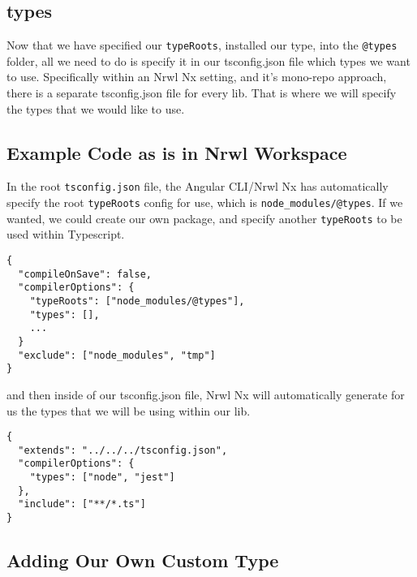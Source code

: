 \subsection{types}
Now that we have specified our \lstinline{typeRoots}, installed our type, into 
the \lstinline{@types} folder, all we need to do is specify it in our 
tsconfig.json file which types we want to use. Specifically within an Nrwl Nx 
setting, and it's mono-repo approach, there is a separate tsconfig.json file 
for every lib. That is where we will specify the types that we would like to 
use. 

\subsection{Example Code as is in Nrwl Workspace}
In the root \lstinline{tsconfig.json} file, the Angular CLI/Nrwl Nx has automatically
specify the root \lstinline{typeRoots} config for use, which is \lstinline{node_modules/@types}.
If we wanted, we could create our own package, and specify another 
\lstinline{typeRoots} to be used within Typescript. 
\begin{lstlisting}[caption=tsconfig.json]
{
  "compileOnSave": false,
  "compilerOptions": {
    "typeRoots": ["node_modules/@types"],
    "types": [],
    ...
  }
  "exclude": ["node_modules", "tmp"]
}
\end{lstlisting}

and then inside of our tsconfig.json file, Nrwl Nx will automatically generate
for us the types that we will be using within our lib. 
\begin{lstlisting}[caption=libs/common/services/tsconfig.json]
{
  "extends": "../../../tsconfig.json",
  "compilerOptions": {
    "types": ["node", "jest"]
  },
  "include": ["**/*.ts"]
} 
\end{lstlisting}

\subsection{Adding Our Own Custom Type}



